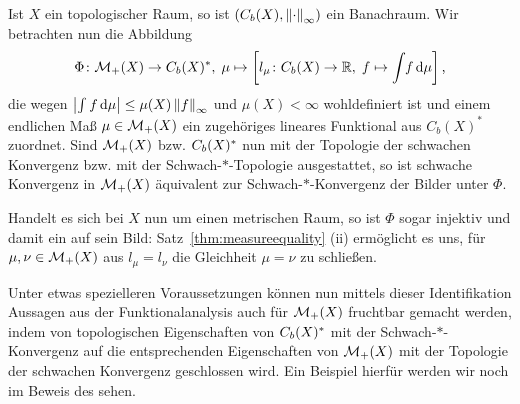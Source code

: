 \documentclass[../main/main.tex]{subfiles}
\begin{document}
	\begin{Bemerkung}
		Ist $X$ ein topologischer Raum, so ist $(C_b(X), \left\lVert\cdot\right\rVert_\infty)$ ein Banachraum. Wir betrachten nun die Abbildung
		$$\Phi \colon \mathcal{M}_{+}(X) \to C_b(X)^\ast, \; \mu \mapsto \left[l_\mu \colon C_b(X) \to \mathbb{R}, \; f \mapsto \int_{} \, f \, \mathrm{d}\mu \right]  \text{,}$$
		die wegen $\left| \int_{} \, f \, \mathrm{d}\mu \right| \leq \mu(X) \left\lVert f\right\rVert_\infty$ und $\mu(X) < \infty$ wohldefiniert ist und einem endlichen Maß
		$\mu \in \mathcal{M}_{+}(X)$ ein zugehöriges lineares Funktional aus $C_b(X)^\ast$ zuordnet. Sind $\mathcal{M}_{+}(X)$ bzw. $C_b(X)^\ast$ nun mit der
		Topologie der schwachen Konvergenz bzw. mit der Schwach-$\ast$-Topologie ausgestattet, so ist schwache Konvergenz in $\mathcal{M}_{+}(X)$ äquivalent zur Schwach-$\ast$-Konvergenz der Bilder unter $\Phi$.
		
		Handelt es sich bei $X$ nun um einen metrischen Raum, so ist $\Phi$ sogar injektiv und damit ein  auf sein Bild:
		Satz~\ref{thm:measureequality} (ii) ermöglicht es uns, für $\mu, \nu \in \mathcal{M}_{+}(X)$ aus $l_\mu = l_\nu$ die Gleichheit 
		$\mu = \nu$ zu schließen. 
		
		Unter etwas spezielleren Voraussetzungen können nun mittels dieser Identifikation Aussagen aus der Funktionalanalysis auch für $\mathcal{M}_{+}(X)$ fruchtbar gemacht werden, indem von topologischen Eigenschaften von
		$C_b(X)^\ast$ mit der Schwach-$\ast$-Konvergenz auf die entsprechenden Eigenschaften von $\mathcal{M}_{+}(X)$ mit der Topologie der schwachen Konvergenz geschlossen wird. Ein Beispiel hierfür werden wir noch im Beweis des  sehen.
	\end{Bemerkung}
	
\end{document}
